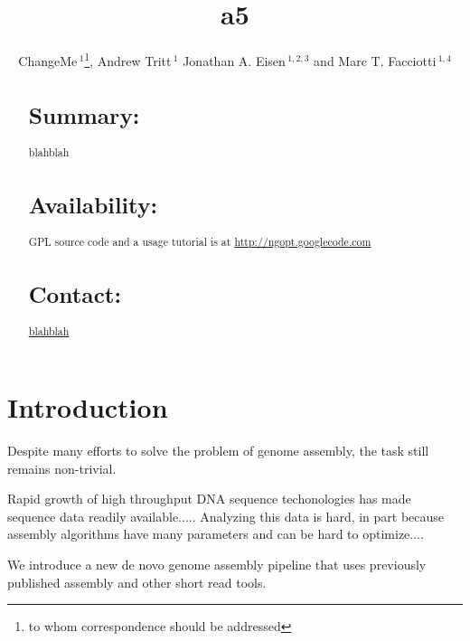 \documentclass{bioinfo}
\begin{document}

\title[a5]{a5}
\author[ChangeMe \textit{et~al}]{ChangeMe\,$^{1}$\footnote{to whom correspondence should be addressed}, Andrew Tritt\,$^{1}$ Jonathan A. Eisen\,$^{1,2,3}$ and Marc T. Facciotti\,$^{1,4}$}
\address{$^{1}$Genome Center, $^{2}$ Dept. of Evolution and Ecology, $^{3}$ Medical Microbiology and Immunology, 
$^{4}$ Biomedical Engineering, University of California-Davis, Davis, CA 95616.}



\maketitle

\begin{abstract}

\section{Summary:}
blahblah
\section{Availability:}
GPL source code and a usage tutorial is at \href{http://ngopt.googlecode.com}{http://ngopt.googlecode.com}

\section{Contact:} \href{blahblah}{blahblah}
\end{abstract}

\section{Introduction}
Despite many efforts to solve the problem of genome assembly, the task still remains non-trivial. 

Rapid growth of high throughput DNA sequence techonologies has made sequence 
data readily available..... Analyzing this data is hard, in part because 
assembly algorithms have many parameters and can be hard to optimize.... 

We introduce a new de novo genome assembly pipeline that uses previously 
published assembly and other short read tools. 
\end{document}
